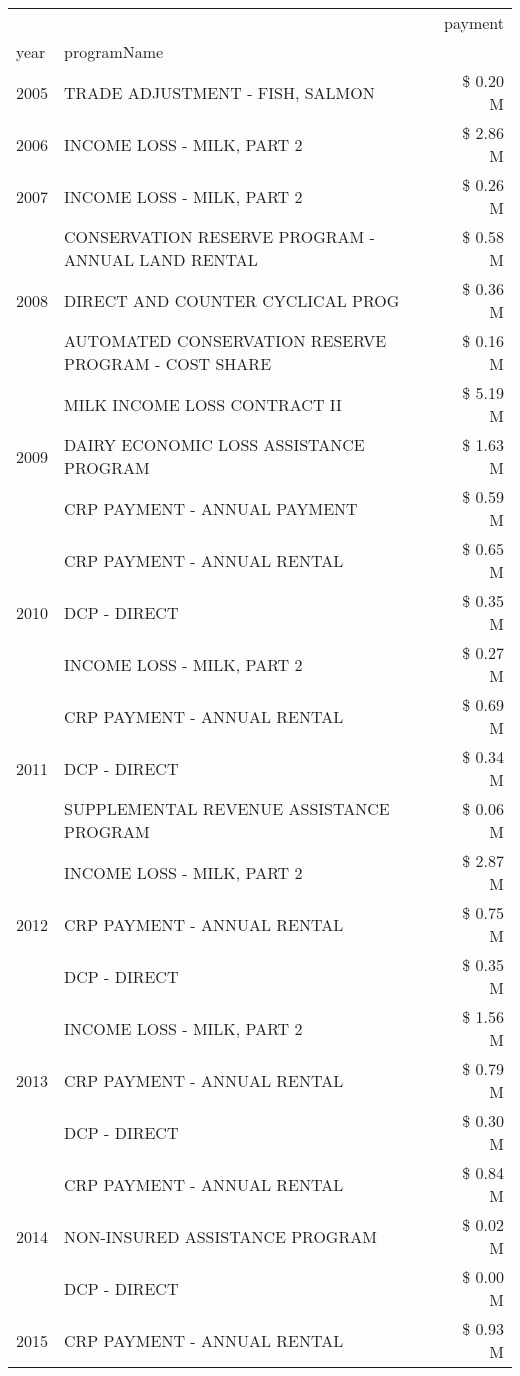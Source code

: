 \begin{tabular}{llr}
\toprule
 &  & payment \\
year & programName &  \\
\midrule
2005 & TRADE ADJUSTMENT - FISH, SALMON & \$ 0.20 M \\
\cline{1-3}
2006 & INCOME LOSS - MILK, PART 2 & \$ 2.86 M \\
\cline{1-3}
2007 & INCOME LOSS - MILK, PART 2 & \$ 0.26 M \\
\cline{1-3}
\multirow[t]{3}{*}{2008} & CONSERVATION RESERVE PROGRAM - ANNUAL LAND RENTAL & \$ 0.58 M \\
 & DIRECT AND COUNTER CYCLICAL PROG & \$ 0.36 M \\
 & AUTOMATED CONSERVATION RESERVE PROGRAM - COST SHARE & \$ 0.16 M \\
\cline{1-3}
\multirow[t]{3}{*}{2009} & MILK INCOME LOSS CONTRACT II & \$ 5.19 M \\
 & DAIRY ECONOMIC LOSS ASSISTANCE PROGRAM & \$ 1.63 M \\
 & CRP PAYMENT - ANNUAL PAYMENT & \$ 0.59 M \\
\cline{1-3}
\multirow[t]{3}{*}{2010} & CRP PAYMENT - ANNUAL RENTAL & \$ 0.65 M \\
 & DCP - DIRECT & \$ 0.35 M \\
 & INCOME LOSS - MILK, PART 2 & \$ 0.27 M \\
\cline{1-3}
\multirow[t]{3}{*}{2011} & CRP PAYMENT - ANNUAL RENTAL & \$ 0.69 M \\
 & DCP - DIRECT & \$ 0.34 M \\
 & SUPPLEMENTAL REVENUE ASSISTANCE PROGRAM & \$ 0.06 M \\
\cline{1-3}
\multirow[t]{3}{*}{2012} & INCOME LOSS - MILK, PART 2 & \$ 2.87 M \\
 & CRP PAYMENT - ANNUAL RENTAL & \$ 0.75 M \\
 & DCP - DIRECT & \$ 0.35 M \\
\cline{1-3}
\multirow[t]{3}{*}{2013} & INCOME LOSS - MILK, PART 2 & \$ 1.56 M \\
 & CRP PAYMENT - ANNUAL RENTAL & \$ 0.79 M \\
 & DCP - DIRECT & \$ 0.30 M \\
\cline{1-3}
\multirow[t]{3}{*}{2014} & CRP PAYMENT - ANNUAL RENTAL & \$ 0.84 M \\
 & NON-INSURED ASSISTANCE PROGRAM & \$ 0.02 M \\
 & DCP - DIRECT & \$ 0.00 M \\
\cline{1-3}
\multirow[t]{3}{*}{2015} & CRP PAYMENT - ANNUAL RENTAL & \$ 0.93 M \\

\end{tabular}
